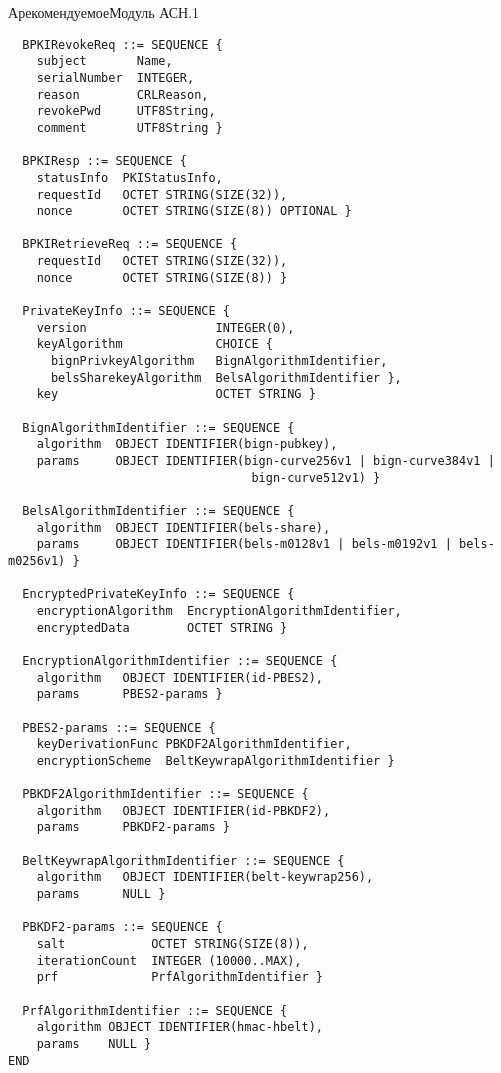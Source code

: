 \begin{appendix}{А}{рекомендуемое}{Модуль АСН.1}
\begin{verbatim}
  BPKIRevokeReq ::= SEQUENCE {
    subject       Name,
    serialNumber  INTEGER,
    reason        CRLReason,
    revokePwd     UTF8String,
    comment       UTF8String }

  BPKIResp ::= SEQUENCE { 
    statusInfo  PKIStatusInfo,
    requestId   OCTET STRING(SIZE(32)),
    nonce       OCTET STRING(SIZE(8)) OPTIONAL }

  BPKIRetrieveReq ::= SEQUENCE {
    requestId   OCTET STRING(SIZE(32)),
    nonce       OCTET STRING(SIZE(8)) }

  PrivateKeyInfo ::= SEQUENCE {
    version                  INTEGER(0),
    keyAlgorithm             CHOICE {
      bignPrivkeyAlgorithm   BignAlgorithmIdentifier,
      belsSharekeyAlgorithm  BelsAlgorithmIdentifier },
    key                      OCTET STRING }
  
  BignAlgorithmIdentifier ::= SEQUENCE {
    algorithm  OBJECT IDENTIFIER(bign-pubkey),
    params     OBJECT IDENTIFIER(bign-curve256v1 | bign-curve384v1 | 
                                  bign-curve512v1) }
  
  BelsAlgorithmIdentifier ::= SEQUENCE {
    algorithm  OBJECT IDENTIFIER(bels-share),
    params     OBJECT IDENTIFIER(bels-m0128v1 | bels-m0192v1 | bels-m0256v1) }

  EncryptedPrivateKeyInfo ::= SEQUENCE {
    encryptionAlgorithm  EncryptionAlgorithmIdentifier,
    encryptedData        OCTET STRING }
  
  EncryptionAlgorithmIdentifier ::= SEQUENCE {
    algorithm   OBJECT IDENTIFIER(id-PBES2),
    params      PBES2-params }
  
  PBES2-params ::= SEQUENCE {
    keyDerivationFunc PBKDF2AlgorithmIdentifier,
    encryptionScheme  BeltKeywrapAlgorithmIdentifier }
  
  PBKDF2AlgorithmIdentifier ::= SEQUENCE {
    algorithm   OBJECT IDENTIFIER(id-PBKDF2),
    params      PBKDF2-params }
  
  BeltKeywrapAlgorithmIdentifier ::= SEQUENCE {
    algorithm   OBJECT IDENTIFIER(belt-keywrap256),
    params      NULL }

  PBKDF2-params ::= SEQUENCE {
    salt            OCTET STRING(SIZE(8)),
    iterationCount  INTEGER (10000..MAX),
    prf             PrfAlgorithmIdentifier }
  
  PrfAlgorithmIdentifier ::= SEQUENCE {
    algorithm OBJECT IDENTIFIER(hmac-hbelt), 
    params    NULL }
END
\end{verbatim}

\end{appendix}
  